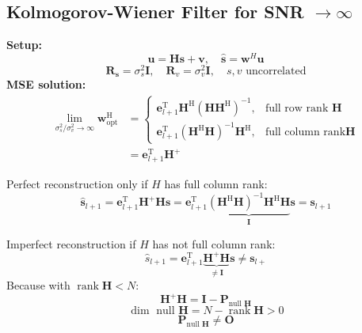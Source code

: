 \documentclass[english]{latex4ei/latex4ei_sheet}
\begin{document}
\begin{sectionbox}
  \subsection{Kolmogorov-Wiener Filter for SNR $\rightarrow \infty$}
  \textbf{Setup:}
  $$\boldsymbol{u} = \boldsymbol{H}\boldsymbol{s}+\boldsymbol{v}, \quad \hat{\boldsymbol{s}} = \boldsymbol{w}^H\boldsymbol{u}$$
  $$\boldsymbol{R}_{\boldsymbol{s}}=\sigma_{s}^{2} \mathbf{I}, \quad \boldsymbol{R}_{v}=\sigma_{v}^{2} \mathbf{I},\quad s,v \text{ uncorrelated}$$
  \textbf{MSE solution:}
  $$\begin{aligned}\lim _{\sigma_{s}^{2} / \sigma_{v}^{2} \rightarrow \infty} \boldsymbol{w}_{\mathrm{opt}}^{\mathrm{H}} &= \begin{cases}\mathbf{e}_{l+1}^{\mathrm{T}} \boldsymbol{H}^{\mathrm{H}}\left(\boldsymbol{H} \boldsymbol{H}^{\mathrm{H}}\right)^{-1}, & \text {full row rank } \boldsymbol{H} \\ \mathbf{e}_{l+1}^{\mathrm{T}}\left(\boldsymbol{H}^{\mathrm{H}} \boldsymbol{H}\right)^{-1} \boldsymbol{H}^{\mathrm{H}}, & \text {full column rank}\boldsymbol{H}\end{cases}\\&=\mathbf{e}_{l+1}^{\mathrm{T}} \boldsymbol{H}^{+}\end{aligned}$$

  Perfect reconstruction only if $H$ has full column rank:\\
  $$\hat{\boldsymbol{s}}_{l+1}=\mathbf{e}_{l+1}^{\mathrm{T}} \boldsymbol{H}^{+} \boldsymbol{H} \boldsymbol{s}=\mathbf{e}_{l+1}^{\mathrm{T}} \underbrace{\left(\boldsymbol{H}^{\mathrm{H}} \boldsymbol{H}\right)^{-1} \boldsymbol{H}^{\mathrm{H}} \boldsymbol{H}}_{\mathbf{I}} \boldsymbol{s}=\boldsymbol{s}_{l+1}$$

  Imperfect reconstruction if $H$ has not full column rank:\\
  $$\hat{s}_{l+1}=\mathbf{e}_{l+1}^{\mathrm{T}} \underbrace{\boldsymbol{H}^{+} \boldsymbol{H}}_{\neq \mathbf{I}} \boldsymbol{s} \neq \boldsymbol{s}_{l+}$$
  Because with $\operatorname{rank} \boldsymbol{H}<N$:\\
  $$\boldsymbol{H}^{+} \boldsymbol{H}=\mathbf{I}-\boldsymbol{P}_{\text {null } \boldsymbol{H}}$$
  $$\operatorname{dim} \text { null } \boldsymbol{H}=N-\operatorname{rank} \boldsymbol{H}>0$$
  $$\boldsymbol{P}_{\text {null } \boldsymbol{H}} \neq \mathbf{O}$$
\end{sectionbox}
\end{document}

